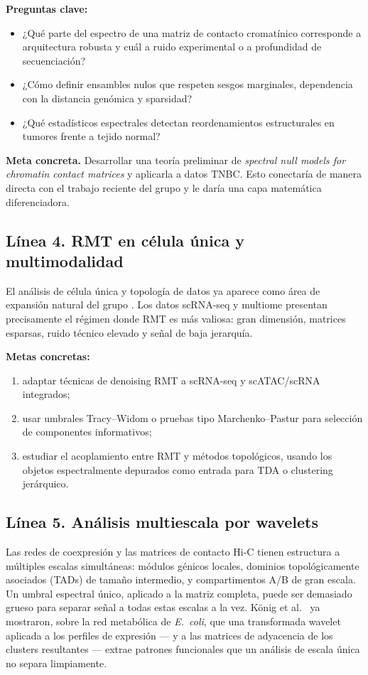 \documentclass[11pt]{article}
\begin{document}
\textbf{Preguntas clave:}
\begin{itemize}
    \item ¿Qué parte del espectro de una matriz de contacto cromatínico corresponde a arquitectura robusta y cuál a ruido experimental o a profundidad de secuenciación?
    \item ¿Cómo definir ensambles nulos que respeten sesgos marginales, dependencia con la distancia genómica y sparsidad?
    \item ¿Qué estadísticos espectrales detectan reordenamientos estructurales en tumores frente a tejido normal?
\end{itemize}

\textbf{Meta concreta.} Desarrollar una teoría preliminar de \emph{spectral null models for chromatin contact matrices} y aplicarla a datos TNBC. Esto conectaría de manera directa con el trabajo reciente del grupo y le daría una capa matemática diferenciadora.

\subsection{Línea 4. RMT en célula única y multimodalidad}
El análisis de célula única y topología de datos ya aparece como área de expansión natural del grupo \cite{csbig, pnas2021}. Los datos scRNA-seq y multiome presentan precisamente el régimen donde RMT es más valiosa: gran dimensión, matrices esparsas, ruido técnico elevado y señal de baja jerarquía.

\textbf{Metas concretas:}
\begin{enumerate}[label=(\alph*)]
    \item adaptar técnicas de denoising RMT a scRNA-seq y scATAC/scRNA integrados;
    \item usar umbrales Tracy--Widom o pruebas tipo Marchenko--Pastur para selección de componentes informativos;
    \item estudiar el acoplamiento entre RMT y métodos topológicos, usando los objetos espectralmente depurados como entrada para TDA o clustering jerárquico.
\end{enumerate}

\subsection{Línea 5. Análisis multiescala por wavelets}
Las redes de coexpresión y las matrices de contacto Hi-C tienen estructura a múltiples escalas simultáneas: módulos génicos locales, dominios topológicamente asociados (TADs) de tamaño intermedio, y compartimentos A/B de gran escala. Un umbral espectral único, aplicado a la matriz completa, puede ser demasiado grueso para separar señal a todas estas escalas a la vez. König et al.\ \cite{konig2006} ya mostraron, sobre la red metabólica de \emph{E.\ coli}, que una transformada wavelet aplicada a los perfiles de expresión --- y a las matrices de adyacencia de los clusters resultantes --- extrae patrones funcionales que un análisis de escala única no separa limpiamente.
\end{document}
